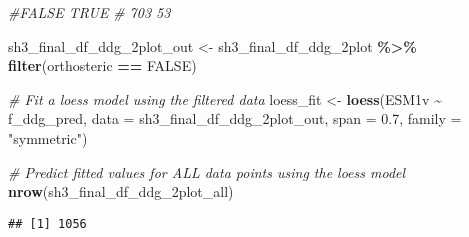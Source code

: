 \documentclass[
]{article}
\newenvironment{Shaded}{\begin{snugshade}}{\end{snugshade}}
\newcommand{\AttributeTok}[1]{\textcolor[rgb]{0.13,0.29,0.53}{#1}}
\newcommand{\CommentTok}[1]{\textcolor[rgb]{0.56,0.35,0.01}{\textit{#1}}}
\newcommand{\ConstantTok}[1]{\textcolor[rgb]{0.56,0.35,0.01}{#1}}
\newcommand{\FloatTok}[1]{\textcolor[rgb]{0.00,0.00,0.81}{#1}}
\newcommand{\FunctionTok}[1]{\textcolor[rgb]{0.13,0.29,0.53}{\textbf{#1}}}
\newcommand{\NormalTok}[1]{#1}
\newcommand{\OtherTok}[1]{\textcolor[rgb]{0.56,0.35,0.01}{#1}}
\newcommand{\SpecialCharTok}[1]{\textcolor[rgb]{0.81,0.36,0.00}{\textbf{#1}}}
\newcommand{\StringTok}[1]{\textcolor[rgb]{0.31,0.60,0.02}{#1}}
\begin{document}
\begin{Shaded}
\begin{Highlighting}[]
\CommentTok{\#FALSE  TRUE }
\CommentTok{\#  703    53 }
\end{Highlighting}
\end{Shaded}

\begin{Shaded}
\begin{Highlighting}[]
\NormalTok{sh3\_final\_df\_ddg\_2plot\_out }\OtherTok{\textless{}{-}}\NormalTok{ sh3\_final\_df\_ddg\_2plot }\SpecialCharTok{\%\textgreater{}\%} \FunctionTok{filter}\NormalTok{(orthosteric }\SpecialCharTok{==} \ConstantTok{FALSE}\NormalTok{)}

\CommentTok{\# Fit a loess model using the filtered data}
\NormalTok{loess\_fit }\OtherTok{\textless{}{-}} \FunctionTok{loess}\NormalTok{(ESM1v }\SpecialCharTok{\textasciitilde{}}\NormalTok{ f\_ddg\_pred, }\AttributeTok{data =}\NormalTok{ sh3\_final\_df\_ddg\_2plot\_out, }\AttributeTok{span =} \FloatTok{0.7}\NormalTok{, }\AttributeTok{family =} \StringTok{"symmetric"}\NormalTok{)}

\CommentTok{\# Predict fitted values for ALL data points using the loess model }
\FunctionTok{nrow}\NormalTok{(sh3\_final\_df\_ddg\_2plot\_all)}
\end{Highlighting}
\end{Shaded}

\begin{verbatim}
## [1] 1056
\end{verbatim}

\begin{Shaded}
\end{Shaded}
\end{document}
